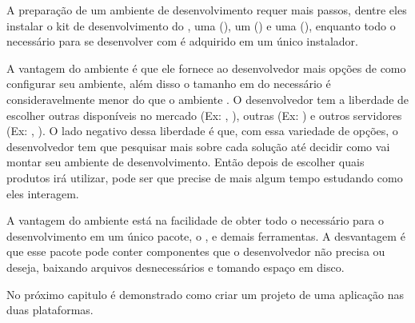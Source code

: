 A preparação de um ambiente de desenvolvimento \spring requer mais passos, dentre eles instalar o kit de desenvolvimento do , uma  (), um  () e uma  (), enquanto  todo o  necessário para se desenvolver com  é adquirido em um único instalador.

A vantagem do ambiente  é que ele fornece ao desenvolvedor mais opções de como configurar seu ambiente, além disso o tamanho em  do  necessário é consideravelmente menor do que o ambiente . O desenvolvedor tem a liberdade de escolher outras  disponíveis no mercado (Ex: , ), outras  (Ex: ) e outros servidores  (Ex: , ). O lado negativo dessa liberdade é que, com  essa variedade de opções, o desenvolvedor tem que pesquisar mais sobre cada solução até decidir como vai montar seu ambiente de desenvolvimento. Então depois de escolher quais produtos irá utilizar, pode ser que precise de mais algum tempo estudando como eles interagem.

A vantagem do ambiente  está na facilidade de obter todo o  necessário para o desenvolvimento em um único pacote, o ,  e demais ferramentas. A desvantagem é que esse pacote pode conter componentes que o desenvolvedor não precisa ou deseja, baixando arquivos desnecessários e tomando espaço em disco.

No próximo capitulo é demonstrado como criar um projeto de uma aplicação  nas duas plataformas.